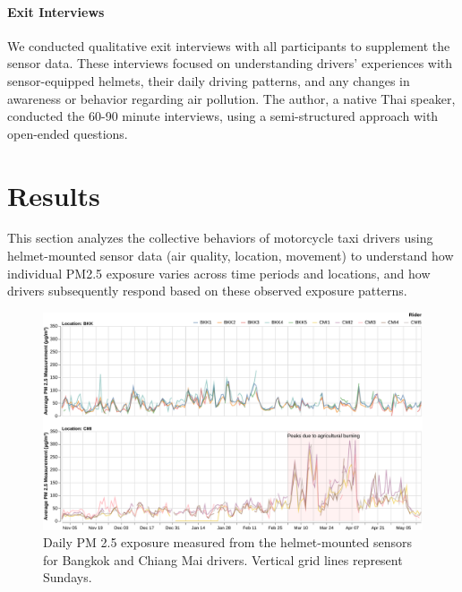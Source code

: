 \documentclass[sigconf,screen,natbib=true]{acmart}
\begin{document}
\paragraph{Exit Interviews}
We conducted qualitative exit interviews with all participants to supplement the sensor data. 
These interviews focused on understanding drivers' experiences with sensor-equipped helmets, their daily driving patterns, and any changes in awareness or behavior regarding air pollution. 
The author, a native Thai speaker, conducted the 60-90 minute interviews, using a semi-structured approach with open-ended questions.  \section{Results}


This section analyzes the collective behaviors of motorcycle taxi drivers using helmet-mounted sensor data (air quality, location, movement) to understand how individual PM2.5 exposure varies across time periods and locations, and how drivers subsequently respond based on these observed exposure patterns.

\begin{figure}
    \centering
    \includegraphics[width=\textwidth]{figures/daily-pollution-per-rider.pdf}
    \caption{
    Daily PM 2.5 exposure measured from the helmet-mounted sensors for Bangkok and Chiang Mai drivers.
    Vertical grid lines represent Sundays.
    }
    \Description{}
    \label{fig:daily-pollution-per-driver}
\end{figure}
\end{document}
